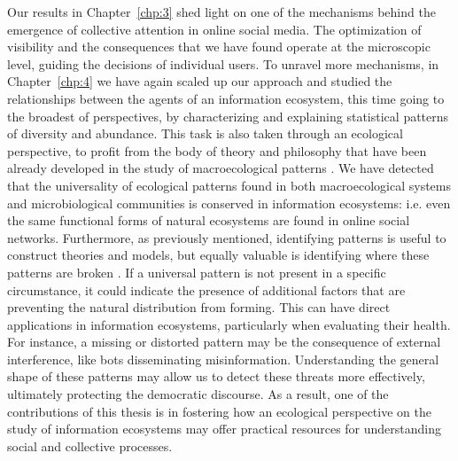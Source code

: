  Our results in Chapter~\ref{chp:3} shed light on one of the mechanisms behind the emergence of collective attention in online social media. The optimization of visibility and the consequences that we have found operate at the microscopic level, guiding the decisions of individual users. To unravel more mechanisms, in Chapter~\ref{chp:4} we have again scaled up our approach and studied the relationships between the agents of an information ecosystem, this time going to the broadest of perspectives, by characterizing and explaining statistical patterns of diversity and abundance. This task is also taken through an ecological perspective, to profit from the body of theory and philosophy that have been already developed in the study of macroecological patterns \cite{brown1995macroecology}. We have detected that the universality of ecological patterns found in both macroecological systems and microbiological communities is conserved in information ecosystems: i.e. even the same functional forms  of natural ecosystems are found in online social networks. Furthermore, as previously mentioned, identifying patterns is useful to construct theories and models, but equally valuable is identifying where these patterns are broken \cite{lego}. If a universal pattern is not present in a specific circumstance, it could indicate the presence of additional factors that are preventing the natural distribution from forming. This can have direct applications in information ecosystems, particularly when evaluating their health. For instance, a missing or distorted pattern may be the consequence of external interference, like bots disseminating misinformation. Understanding the general shape of these patterns may allow us to detect these threats more effectively, ultimately protecting the democratic discourse. As a result, one of the contributions of this thesis is in  fostering how an ecological perspective on the study of information ecosystems may offer practical resources for understanding social and collective processes.\\

